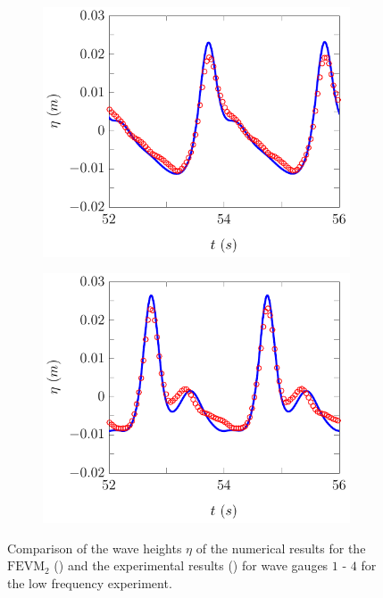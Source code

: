 \begin{figure}
\begin{subfigure}{0.5\textwidth}
	\end{subfigure}
	\begin{subfigure}{0.5\textwidth}
		\includegraphics[width=\textwidth]{./chp6/figures/Experiment/Beji/sl/FEVMWG3.pdf}
		\vspace{0.5cm}
	\end{subfigure}%
	\begin{subfigure}{0.5\textwidth}
		\includegraphics[width=\textwidth]{./chp6/figures/Experiment/Beji/sl/FEVMWG4.pdf}
		\vspace{0.5cm}
	\end{subfigure}
	\caption{Comparison of the wave heights $\eta$ of the numerical results for the $\text{FEVM}_2$ ({\color{blue}\solidrule}) and the experimental results () for wave gauges $1$ - $4$ for the low frequency experiment.}
	\label{fig:BejislWG1to4FEVM}
\end{figure}

